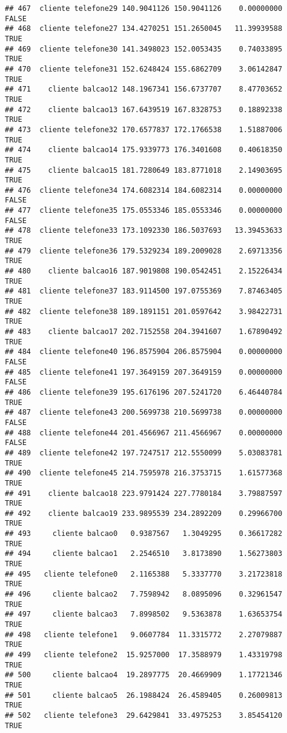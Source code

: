 \documentclass[
]{article}
\begin{document}
\begin{verbatim}
## 467  cliente telefone29 140.9041126 150.9041126    0.00000000    FALSE
## 468  cliente telefone27 134.4270251 151.2650045   11.39939588     TRUE
## 469  cliente telefone30 141.3498023 152.0053435    0.74033895     TRUE
## 470  cliente telefone31 152.6248424 155.6862709    3.06142847     TRUE
## 471    cliente balcao12 148.1967341 156.6737707    8.47703652     TRUE
## 472    cliente balcao13 167.6439519 167.8328753    0.18892338     TRUE
## 473  cliente telefone32 170.6577837 172.1766538    1.51887006     TRUE
## 474    cliente balcao14 175.9339773 176.3401608    0.40618350     TRUE
## 475    cliente balcao15 181.7280649 183.8771018    2.14903695     TRUE
## 476  cliente telefone34 174.6082314 184.6082314    0.00000000    FALSE
## 477  cliente telefone35 175.0553346 185.0553346    0.00000000    FALSE
## 478  cliente telefone33 173.1092330 186.5037693   13.39453633     TRUE
## 479  cliente telefone36 179.5329234 189.2009028    2.69713356     TRUE
## 480    cliente balcao16 187.9019808 190.0542451    2.15226434     TRUE
## 481  cliente telefone37 183.9114500 197.0755369    7.87463405     TRUE
## 482  cliente telefone38 189.1891151 201.0597642    3.98422731     TRUE
## 483    cliente balcao17 202.7152558 204.3941607    1.67890492     TRUE
## 484  cliente telefone40 196.8575904 206.8575904    0.00000000    FALSE
## 485  cliente telefone41 197.3649159 207.3649159    0.00000000    FALSE
## 486  cliente telefone39 195.6176196 207.5241720    6.46440784     TRUE
## 487  cliente telefone43 200.5699738 210.5699738    0.00000000    FALSE
## 488  cliente telefone44 201.4566967 211.4566967    0.00000000    FALSE
## 489  cliente telefone42 197.7247517 212.5550099    5.03083781     TRUE
## 490  cliente telefone45 214.7595978 216.3753715    1.61577368     TRUE
## 491    cliente balcao18 223.9791424 227.7780184    3.79887597     TRUE
## 492    cliente balcao19 233.9895539 234.2892209    0.29966700     TRUE
## 493     cliente balcao0   0.9387567   1.3049295    0.36617282     TRUE
## 494     cliente balcao1   2.2546510   3.8173890    1.56273803     TRUE
## 495   cliente telefone0   2.1165388   5.3337770    3.21723818     TRUE
## 496     cliente balcao2   7.7598942   8.0895096    0.32961547     TRUE
## 497     cliente balcao3   7.8998502   9.5363878    1.63653754     TRUE
## 498   cliente telefone1   9.0607784  11.3315772    2.27079887     TRUE
## 499   cliente telefone2  15.9257000  17.3588979    1.43319798     TRUE
## 500     cliente balcao4  19.2897775  20.4669909    1.17721346     TRUE
## 501     cliente balcao5  26.1988424  26.4589405    0.26009813     TRUE
## 502   cliente telefone3  29.6429841  33.4975253    3.85454120     TRUE

\end{verbatim}
\end{document}
